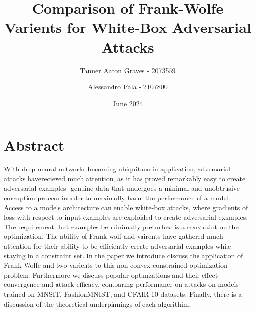 \documentclass{article}
\title{Comparison of Frank-Wolfe Varients for White-Box Adversarial Attacks}
\author{Tanner Aaron Graves - 2073559\and Alessandro Pala - 2107800}
\date{June 2024}
\begin{document}
\maketitle 
\section{Abstract}
With deep neural networks becoming ubiquitous in application, adversarial attacks haverecieved much attention, as it has proved remarkably easy to create adversarial examples- genuine data that undergoes a minimal and unobtrusive corruption process inorder to maximally harm the performance of a model. Access to a models architecture can enable white-box attacks, where gradients of loss with respect to input examples are exploided to create adversarial examples. The requirement that examples be minimally preturbed is a constraint on the optimization. The ability of Frank-wolf and vairents have gathered much attention for their ability to be efficiently create adversarial examples while staying in a constraint set. In the paper we introduce discuss the application of Frank-Wolfe and two varients to this non-convex constrained optimization problem. Furthermore we discuss popular optimzations and their effect convergence and attack efficacy, comparing performance on attacks on models trained on MNSIT, FashionMNIST, and CFAIR-10 datasets. Finally, there is a discussion of the theoretical underpinnings of each algorithim.
\end{document}
